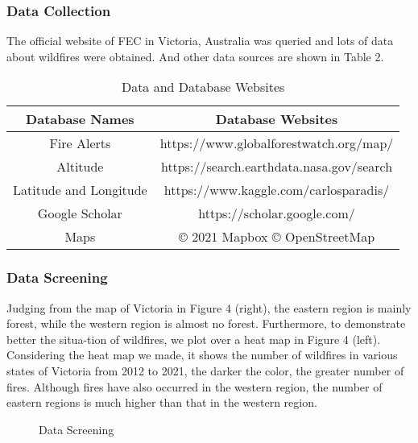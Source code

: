 \documentclass[12pt]{article}  %
\begin{document}
 \subsubsection{Data Collection}
 The official website of FEC in Victoria, Australia was queried and lots of data about wildfires were obtained. And other data sources are shown in Table 2.
 
 \begin{table}[htbp]
 \begin{center}
 \caption{Data and Database Websites}
 \resizebox{\textwidth}{!}
 {\begin{tabular}{c c}
 \toprule[2pt]
 \multicolumn{1}{m{5cm}}{\centering \textbf{Database Names}}
 &\multicolumn{1}{m{10cm}}{\centering \textbf{Database Websites} }\\ %
 \midrule
 Fire Alerts& https://www.globalforestwatch.org/map/ \\
 Altitude & https://search.earthdata.nasa.gov/search \\
 Latitude and Longitude & https://www.kaggle.com/carlosparadis/\\ 
 Google Scholar & https://scholar.google.com/ \\
 Maps& \copyright{} 2021 Mapbox \copyright{} OpenStreetMap\\
 \bottomrule[2pt]
 \end{tabular}}
 \end{center}
 \end{table}
 
 \subsubsection{Data Screening}
 Judging from the map of Victoria in Figure 4 (right), the eastern region is mainly forest, while the western region is almost no forest. Furthermore, to demonstrate better the situa-tion of wildfires, we plot over a heat map in Figure 4 (left).
 Considering the heat map we made, it shows the number of wildfires in various states of Victoria from 2012 to 2021, the darker the color, the greater number of fires. Although fires have also occurred in the western region, the number of eastern regions is much higher than that in the western region. 
 
 \begin{figure}[htbp]
     \centering    
     \caption{Data Screening} %
 \end{figure}
 
\end{document}
